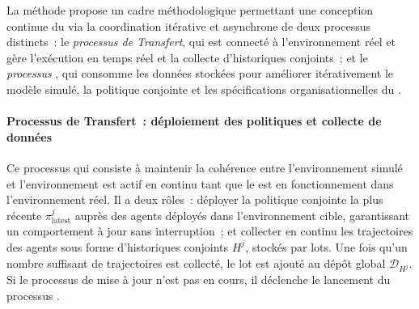 La méthode  propose un cadre méthodologique permettant une conception continue du  via la coordination itérative et asynchrone de deux processus distincts~: le \textit{processus de Transfert}, qui est connecté à l'environnement réel et gère l'exécution en temps réel et la collecte d'historiques conjoints~; et le \textit{processus }, qui consomme les données stockées pour améliorer itérativement le modèle simulé, la politique conjointe et les spécifications organisationnelles du .

\paragraph{Processus de Transfert~: déploiement des politiques et collecte de données}

Ce processus qui consiste à maintenir la cohérence entre l'environnement simulé et l'environnement est actif en continu tant que le  est en fonctionnement dans l'environnement réel. Il a deux rôles~: déployer la politique conjointe la plus récente $\pi^j_{\text{latest}}$ auprès des agents déployés dans l'environnement cible, garantissant un comportement à jour sans interruption~; et collecter en continu les trajectoires des agents sous forme d'historiques conjoints $H^j$, stockés par lots. Une fois qu'un nombre suffisant de trajectoires est collecté, le lot est ajouté au dépôt global $\mathcal{D}_{H^j}$. Si le processus de mise à jour n'est pas en cours, il déclenche le lancement du processus .


